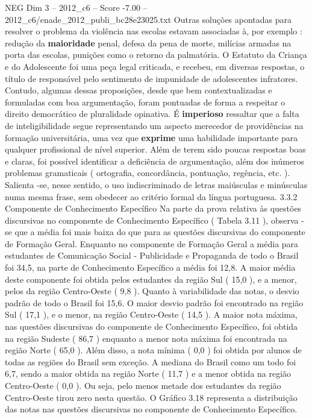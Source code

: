 \begin{textsample}{NEG Dim 3 – 2012\_c6 – Score -7.00 – 2012\_c6/enade\_2012\_publi\_bc28e23025.txt}
Outras soluções apontadas para resolver o problema da violência nas escolas estavam associadas à, por exemplo : redução da \textbf{maioridade} penal, defesa da pena de morte, milícias armadas na porta das escolas, punições como o retorno da palmatória.
O Estatuto da Criança e do Adolescente foi uma peça legal criticada, e recebeu, em diversas respostas, o título de responsável pelo sentimento de impunidade de adolescentes infratores.
Contudo, algumas dessas proposições, desde que bem contextualizadas e formuladas com boa argumentação, foram pontuadas de forma a respeitar o direito democrático de pluralidade opinativa.
É \textbf{imperioso} ressaltar que a falta de inteligibilidade segue representando um aspecto merecedor de providências na formação universitária, uma vez que \textbf{exprime} uma habilidade importante para qualquer profissional de nível superior.
Além de terem sido poucas respostas boas e claras, foi possível identificar a deficiência de argumentação, além dos inúmeros problemas gramaticais ( ortografia, concordância, pontuação, regência, etc. ).
Salienta -se, nesse sentido, o uso indiscriminado de letras maiúsculas e minúsculas numa mesma frase, sem obedecer ao critério formal da língua portuguesa. 3.3.2 Componente de Conhecimento Específico Na parte da prova relativa às questões discursivas no componente de Conhecimento Específico ( Tabela 3.11 ), observa -se que a média foi mais baixa do que para as questões discursivas do componente de Formação Geral.
Enquanto no componente de Formação Geral a média para estudantes de Comunicação Social - Publicidade e Propaganda de todo o Brasil foi 34,5, na parte de Conhecimento Específico a média foi 12,8.
A maior média deste componente foi obtida pelos estudantes da região Sul ( 15,0 ), e a menor, pelos da região Centro-Oeste ( 9,8 ).
Quanto à variabilidade das notas, o desvio padrão de todo o Brasil foi 15,6.
O maior desvio padrão foi encontrado na região Sul ( 17,1 ), e o menor, na região Centro-Oeste ( 14,5 ).
A maior nota máxima, nas questões discursivas do componente de Conhecimento Específico, foi obtida na região Sudeste ( 86,7 ) enquanto a menor nota máxima foi encontrada na região Norte ( 65,0 ).
Além disso, a nota mínima ( 0,0 ) foi obtida por alunos de todas as regiões do Brasil sem exceção.
A mediana do Brasil como um todo foi 6,7, sendo a maior obtida na região Norte ( 11,7 ) e a menor obtida na região Centro-Oeste ( 0,0 ).
Ou seja, pelo menos metade dos estudantes da região Centro-Oeste tirou zero nesta questão.
O Gráfico 3.18 representa a distribuição das notas nas questões discursivas no componente de Conhecimento Específico.

\end{textsample}
